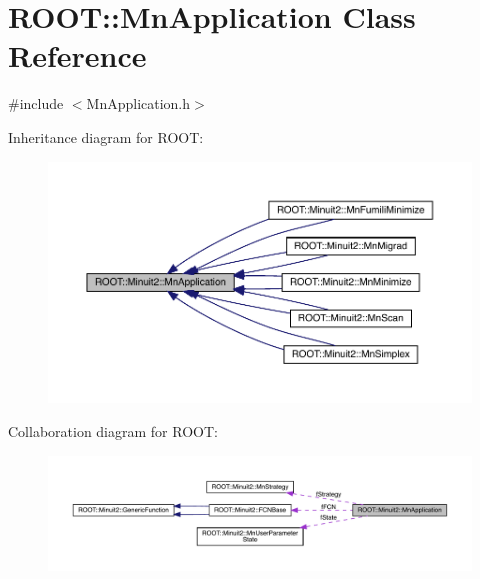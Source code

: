 \hypertarget{classROOT_1_1Minuit2_1_1MnApplication}{}\section{R\+O\+OT\+:\+:Mn\+Application Class Reference}
\label{classROOT_1_1Minuit2_1_1MnApplication}


{\ttfamily \#include $<$Mn\+Application.\+h$>$}



Inheritance diagram for R\+O\+OT\+:\nopagebreak
\begin{figure}[H]
\begin{center}
\leavevmode
\includegraphics[width=350pt]{de/d0b/classROOT_1_1Minuit2_1_1MnApplication__inherit__graph}
\end{center}
\end{figure}


Collaboration diagram for R\+O\+OT\+:\nopagebreak
\begin{figure}[H]
\begin{center}
\leavevmode
\includegraphics[width=350pt]{d1/ddf/classROOT_1_1Minuit2_1_1MnApplication__coll__graph}
\end{center}
\end{figure}
